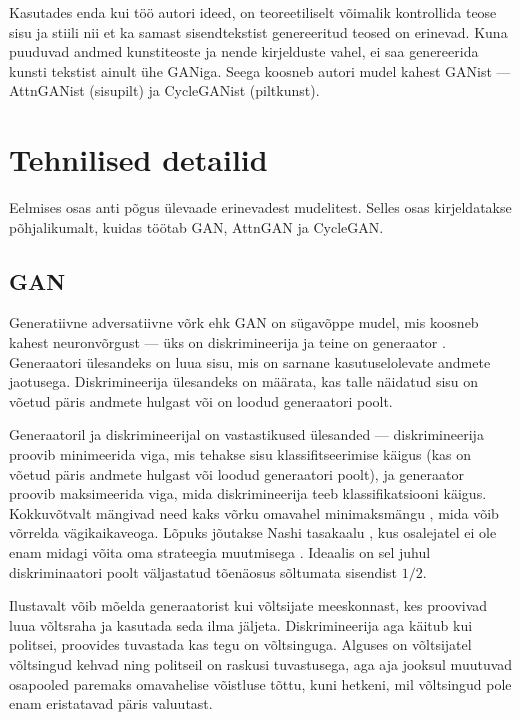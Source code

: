 \documentclass{vilgym}
\begin{document}
	Kasutades enda kui töö autori ideed, on teoreetiliselt võimalik kontrollida teose sisu ja stiili nii et ka samast sisendtekstist genereeritud teosed on erinevad. Kuna puuduvad andmed kunstiteoste ja nende kirjelduste vahel, ei saa genereerida kunsti tekstist ainult ühe GANiga. Seega koosneb autori mudel kahest GANist --- AttnGANist (sisu\textrightarrow pilt) ja CycleGANist (pilt\textrightarrow kunst). %

	\section{Tehnilised detailid}
	Eelmises osas anti põgus ülevaade erinevadest mudelitest. Selles osas kirjeldatakse põhjalikumalt, kuidas töötab GAN, AttnGAN ja CycleGAN.

	\subsection{GAN}
	Generatiivne adversatiivne võrk ehk GAN  on sügavõppe mudel, mis koosneb kahest neuronvõrgust --- üks on diskrimineerija  ja teine on generaator .  Generaatori ülesandeks on luua sisu, mis on sarnane kasutuselolevate andmete jaotusega. Diskrimineerija ülesandeks on määrata, kas talle näidatud sisu on võetud päris andmete hulgast või on loodud generaatori poolt.
	
	Generaatoril ja diskrimineerijal on vastastikused ülesanded --- diskrimineerija proovib minimeerida viga, mis tehakse sisu klassifitseerimise käigus (kas on võetud päris andmete hulgast või loodud generaatori poolt), ja generaator proovib maksimeerida viga, mida diskrimineerija teeb klassifikatsiooni käigus. Kokkuvõtvalt mängivad need kaks võrku omavahel minimaksmängu , mida võib võrrelda vägikaikaveoga. Lõpuks jõutakse Nashi tasakaalu , kus osalejatel ei ole enam midagi võita oma strateegia muutmisega \parencite{gametheory}. Ideaalis on sel juhul diskriminaatori poolt väljastatud tõenäosus sõltumata sisendist $ 1/2 $.

	Ilustavalt võib mõelda generaatorist kui võltsijate meeskonnast, kes proovivad luua võltsraha ja kasutada seda ilma jäljeta. Diskrimineerija aga käitub kui politsei, proovides tuvastada kas tegu on võltsinguga. Alguses on võltsijatel võltsingud kehvad ning politseil on raskusi tuvastusega, aga aja jooksul muutuvad osapooled paremaks omavahelise võistluse tõttu, kuni hetkeni, mil võltsingud pole enam eristatavad päris valuutast.
\end{document}
